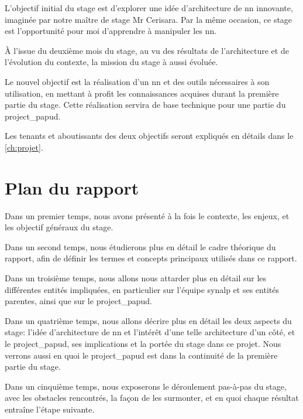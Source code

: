 L'objectif initial du stage est d'explorer une idée d'architecture de \gls{nn} innovante, imaginée par notre maître de stage Mr Cerisara.
Par la même occasion, ce stage est l'opportunité pour moi d'apprendre à manipuler les \gls{nn}.

À l'issue du deuxième mois du stage, au vu des résultats de l'architecture et de l'évolution du contexte, la mission du stage à aussi évoluée.

Le nouvel objectif est la réalisation d'un \gls{nn} et des outils nécessaires à son utilisation, en mettant à profit les connaissances acquises durant la première partie du stage.
Cette réalisation servira de base technique pour une partie du \gls{project_papud}.

Les tenants et aboutissants des deux objectifs seront expliqués en détails dans le \autoref{ch:projet}.

\section[Plan]{Plan du rapport}

Dans un premier temps, nous avons présenté à la fois le contexte, les enjeux, et les objectif généraux du stage.

Dans un second temps, nous étudierons plus en détail le cadre théorique du rapport, afin de définir les termes et concepts principaux utilisés dans ce rapport.

Dans un troisième temps, nous allons nous attarder plus en détail sur les différentes entités impliquées, en particulier sur l'équipe \gls{synalp} et ses entités parentes, ainsi que sur le \gls{project_papud}.

Dans un quatrième temps, nous allons décrire plus en détail les deux aspects du stage: l'idée d'architecture de \gls{nn} et l'intérêt d'une telle architecture d'un côté, et le \gls{project_papud}, ses implications et la portée du stage dans ce projet. Nous verrons aussi en quoi le \gls{project_papud} est dans la continuité de la première partie du stage.

Dans un cinquième temps, nous exposerons le déroulement pas-à-pas du stage, avec les obstacles rencontrés, la façon de les surmonter, et en quoi chaque résultat entraîne l'étape suivante. 

